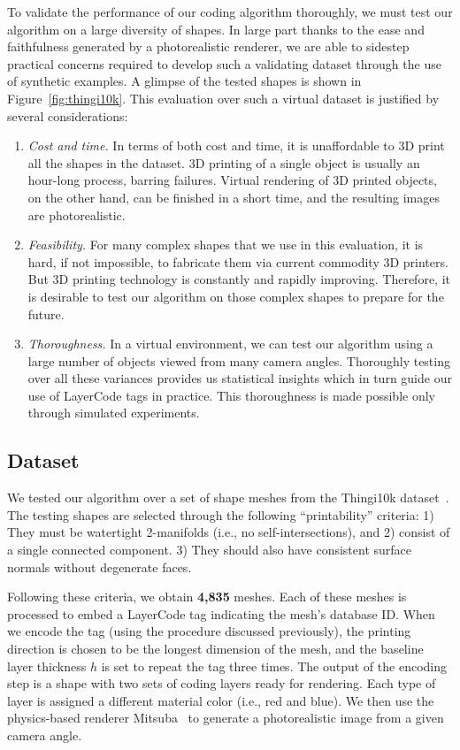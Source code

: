 \documentclass[12pt]{report}
\newcommand{\ft}{4,835 }
\begin{document}
To validate the performance of our coding algorithm thoroughly, we must test our
algorithm on a large diversity of shapes.
In large part thanks to the ease and faithfulness generated by a photorealistic renderer,
we are able to sidestep practical concerns required to 
develop such a validating dataset through the use of synthetic examples.
A glimpse of the tested shapes is shown in Figure~\ref{fig:thingi10k}. 
This evaluation over such a virtual dataset is justified by several considerations:

\begin{enumerate}[itemsep=1pt,leftmargin=12pt,label=\roman{*}.]%
\item \textit{Cost and time.}
    In terms of both cost and time, it is unaffordable to 3D print all the
    shapes in the dataset. 3D printing of a single object is usually an
    hour-long process, barring failures.
    Virtual rendering of 3D printed objects, on the other hand, can be finished in 
    a short time, and the resulting images are photorealistic.
\item \textit{Feasibility.} 
For many complex shapes that we use in this evaluation, it is hard, if not
impossible, to fabricate them via current commodity 3D printers.  But 3D printing
technology is constantly and rapidly improving. Therefore, it is desirable to
test our algorithm on those complex shapes to prepare for the future.
\item \textit{Thoroughness.}
    In a virtual environment, we can test our algorithm using a large number of 
    objects viewed from many camera angles. Thoroughly testing over all these variances 
    provides us statistical insights which in turn guide our use of LayerCode tags in practice.
    This thoroughness is made possible only through simulated experiments.
\end{enumerate}


\subsection{Dataset}

We tested our algorithm over a set of shape meshes from the Thingi10k dataset~\cite{Thingi10K}.
The testing shapes are selected through the following ``printability'' criteria: 
1) They must be watertight 2-manifolds (i.e., no self-intersections), and 
2) consist of a single connected component.
3) They should also have consistent surface normals without degenerate faces.

Following these criteria, we obtain \textbf{\ft}meshes.
Each of these meshes is processed to embed a LayerCode tag indicating the
mesh's database ID. When we encode the tag (using the procedure discussed previously),
the printing direction is chosen to be the longest dimension of the mesh, and 
the baseline layer thickness $h$ is set to repeat the tag three times.
The output of the encoding step is a shape with two sets of coding layers ready for rendering. 
Each type of layer is assigned a different material color (i.e., red and blue).
We then use the physics-based renderer Mitsuba~\cite{Mitsuba} to 
generate a photorealistic image from a given camera angle.
\end{document}
